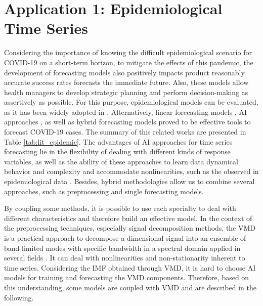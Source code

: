 \section{Application 1: Epidemiological Time Series}

Considering the importance of knowing the difficult epidemiological scenario for \ac{COVID-19} on a short-term horizon, to mitigate the effects of this pandemic, the development of forecasting models also positively impacts product reasonably accurate success rates forecasts the immediate future. Also, these models allow health managers to develop strategic planning and perform decision-making as assertively as possible. For this purpose, epidemiological models can be evaluated, as it has been widely adopted in \cite{ndairou2020Mathematical,barmparis2020Estimating}. Alternatively, linear forecasting models \cite{zhang2020Predicting,ceylan2020Estimation,ahmar2020SutteARIMA}, \ac{AI} approaches \cite{ribeiro2020Shortterm,chimmula2020Time}, as well as hybrid forecasting models \cite{chakraborty2020Realtime,singh2020Development} proved to be effective tools to forecast \ac{COVID-19} cases. The summary of this related works are presented in Table \ref{tab:lit_epidemic}. The advantages of \ac{AI} approaches for time series forecasting lie in the flexibility of dealing with different kinds of response variables, as well as the ability of these approaches to learn data dynamical behavior and complexity and accommodate nonlinearities, such as the observed in epidemiological data \cite{ribeiro2019Forecasting}. Besides, hybrid methodologies allow us to combine several approaches, such as preprocessing and single forecasting models. 

By coupling some methods, it is possible to use each specialty to deal with different characteristics and therefore build an effective model. In the context of the preprocessing techniques, especially signal decomposition methods, the \ac{VMD} is a practical approach to decompose a dimensional signal into an ensemble of band-limited modes with specific bandwidth in a spectral domain applied in several fields \cite{moreno2020Multistep, wu2019Daily, li2019Monthly}. It can deal with nonlinearities and non-stationarity inherent to time series. Considering the \ac{IMF} obtained through \ac{VMD}, it is hard to choose \ac{AI} models for training and forecasting the \ac{VMD} components. Therefore, based on this understanding, some models are coupled with \ac{VMD} and are described in the following.

